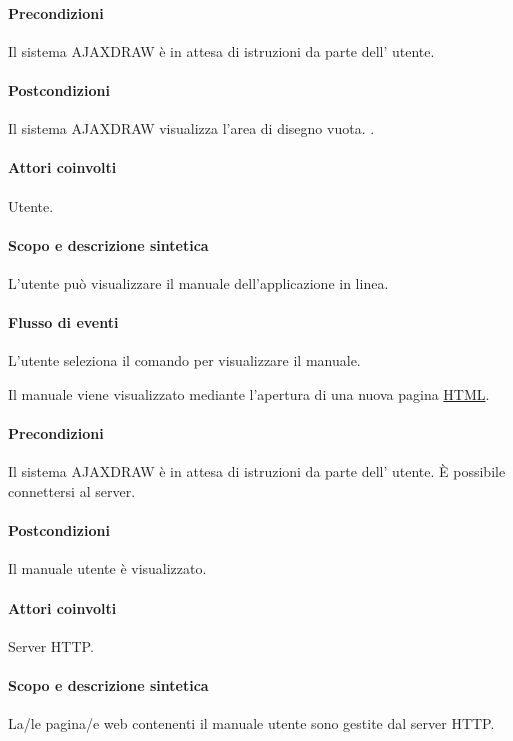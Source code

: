 \paragraph{Precondizioni}  Il sistema AJAXDRAW \`e in attesa di istruzioni da parte dell' utente.
\paragraph{Postcondizioni} Il sistema AJAXDRAW visualizza l'area di disegno vuota.
.

\paragraph{Attori coinvolti} Utente.
\paragraph{Scopo e descrizione sintetica}
L'utente pu\`o visualizzare il manuale dell'applicazione in linea.
\paragraph{Flusso di eventi}
\begin{elenconumerato}[\textbf{}]{\subsubsecindent}
\item L'utente seleziona il comando per visualizzare il manuale. 
\item Il manuale viene visualizzato mediante l'apertura di una nuova pagina {\underline{HTML}}.
\end{elenconumerato}
\paragraph{Precondizioni} Il sistema AJAXDRAW \`e in attesa di istruzioni da parte dell' utente. \`E possibile connettersi al server.
\paragraph{Postcondizioni} Il manuale utente \`e visualizzato.

\paragraph{Attori coinvolti} Server HTTP.
\paragraph{Scopo e descrizione sintetica}
La/le pagina/e web contenenti il manuale utente sono gestite dal server HTTP.
